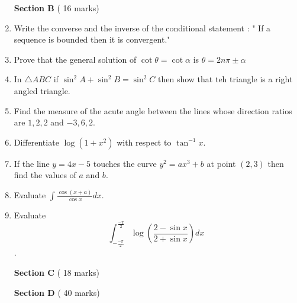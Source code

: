 \documentclass[12pt,a4paper]{article}
\begin{document}
\begin{enumerate}
\begin{center}
\textbf {Section B} ( 16 marks)
\end{center}
\item Write the converse and the inverse of the conditional statement :  " If a sequence is bounded then it is convergent." 
\item Prove that the general solution of $ \cot \theta = \cot \alpha $ is $ \theta = 2n \pi \pm \alpha $
\item In $ \triangle ABC $ if $ \sin^2 A+\sin^2B=\sin^2C $ then show that teh triangle is a right angled triangle. 
\item Find the measure of the acute angle between the lines whose direction ratios are $ 1,2,2 $ and $ -3, 6,2 $. 
\item Differentiate $ \log (1+x^2)$ with respect to $ \tan^{-1}x $.
\item If the line $ y=4x-5  $ touches the curve $ y^2=ax^3+b $ at point $ (2, 3) $ then find the values of $ a $ and $ b $. 
\item Evaluate $ \int \frac {\cos (x+a)}{\cos x} dx $.
\item Evaluate \[ \int_{-\frac{-\pi}{2}}^{\frac{-\pi}{2}} \log (\frac {2-\sin x}{2+ \sin x} ) dx \]. 


\begin{center}
\textbf {Section C} ( 18 marks)
\end{center}


\textbf {Section D} ( 40 marks)

\end{enumerate}
\end{document}
